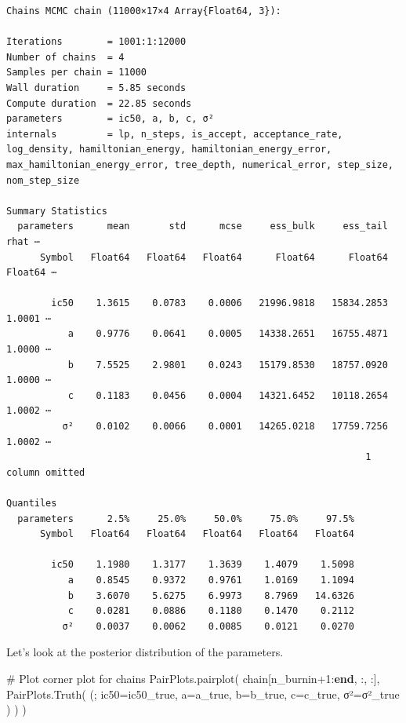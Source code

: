 \documentclass[
]{scrartcl}
\newenvironment{Shaded}{\begin{snugshade}}{\end{snugshade}}
\newcommand{\CommentTok}[1]{\textcolor[rgb]{0.37,0.37,0.37}{#1}}
\newcommand{\FloatTok}[1]{\textcolor[rgb]{0.68,0.00,0.00}{#1}}
\newcommand{\FunctionTok}[1]{\textcolor[rgb]{0.28,0.35,0.67}{#1}}
\newcommand{\KeywordTok}[1]{\textcolor[rgb]{0.00,0.23,0.31}{\textbf{#1}}}
\newcommand{\NormalTok}[1]{\textcolor[rgb]{0.00,0.23,0.31}{#1}}
\newcommand{\OperatorTok}[1]{\textcolor[rgb]{0.37,0.37,0.37}{#1}}
\begin{document}
\begin{verbatim}
Chains MCMC chain (11000×17×4 Array{Float64, 3}):

Iterations        = 1001:1:12000
Number of chains  = 4
Samples per chain = 11000
Wall duration     = 5.85 seconds
Compute duration  = 22.85 seconds
parameters        = ic50, a, b, c, σ²
internals         = lp, n_steps, is_accept, acceptance_rate, log_density, hamiltonian_energy, hamiltonian_energy_error, max_hamiltonian_energy_error, tree_depth, numerical_error, step_size, nom_step_size

Summary Statistics
  parameters      mean       std      mcse     ess_bulk     ess_tail      rhat ⋯
      Symbol   Float64   Float64   Float64      Float64      Float64   Float64 ⋯

        ic50    1.3615    0.0783    0.0006   21996.9818   15834.2853    1.0001 ⋯
           a    0.9776    0.0641    0.0005   14338.2651   16755.4871    1.0000 ⋯
           b    7.5525    2.9801    0.0243   15179.8530   18757.0920    1.0000 ⋯
           c    0.1183    0.0456    0.0004   14321.6452   10118.2654    1.0002 ⋯
          σ²    0.0102    0.0066    0.0001   14265.0218   17759.7256    1.0002 ⋯
                                                                1 column omitted

Quantiles
  parameters      2.5%     25.0%     50.0%     75.0%     97.5%
      Symbol   Float64   Float64   Float64   Float64   Float64

        ic50    1.1980    1.3177    1.3639    1.4079    1.5098
           a    0.8545    0.9372    0.9761    1.0169    1.1094
           b    3.6070    5.6275    6.9973    8.7969   14.6326
           c    0.0281    0.0886    0.1180    0.1470    0.2112
          σ²    0.0037    0.0062    0.0085    0.0121    0.0270
\end{verbatim}

Let's look at the posterior distribution of the parameters.

\begin{Shaded}
\begin{Highlighting}[]
\CommentTok{\# Plot corner plot for chains}
\NormalTok{PairPlots.}\FunctionTok{pairplot}\NormalTok{(}
\NormalTok{    chain[n\_burnin}\OperatorTok{+}\FloatTok{1}\OperatorTok{:}\KeywordTok{end}\NormalTok{, }\OperatorTok{:}\NormalTok{, }\OperatorTok{:}\NormalTok{],}
\NormalTok{    PairPlots.}\FunctionTok{Truth}\NormalTok{(}
\NormalTok{        (;}
\NormalTok{        ic50}\OperatorTok{=}\NormalTok{ic50\_true,}
\NormalTok{        a}\OperatorTok{=}\NormalTok{a\_true,}
\NormalTok{        b}\OperatorTok{=}\NormalTok{b\_true,}
\NormalTok{        c}\OperatorTok{=}\NormalTok{c\_true,}
\NormalTok{        σ²}\OperatorTok{=}\NormalTok{σ²\_true}
\NormalTok{    )}
\NormalTok{    )}
\NormalTok{)}
\end{Highlighting}
\end{Shaded}
\end{document}
